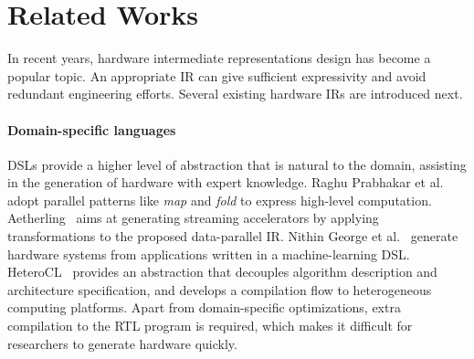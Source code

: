 \section{Related Works}

In recent years, hardware intermediate representations design has become a popular topic. An appropriate IR can give sufficient expressivity and avoid redundant engineering efforts. Several existing hardware IRs are introduced next.

\paragraph{Domain-specific languages} DSLs provide a higher level of abstraction that is natural to the domain, assisting in the generation of hardware with expert knowledge. Raghu Prabhakar et al.~\cite{parallel_pattern} adopt parallel patterns like \emph{map} and \emph{fold} to express high-level computation. Aetherling~\cite{aetherling} aims at generating streaming accelerators by applying transformations to the proposed data-parallel IR. Nithin George et al.~\cite{system_dsl} generate hardware systems from applications written in a machine-learning DSL. HeteroCL~\cite{heterocl} provides an abstraction that decouples algorithm description and architecture specification, and develops a compilation flow to heterogeneous computing platforms. Apart from domain-specific optimizations, extra compilation to the RTL program is required, which makes it difficult for researchers to generate hardware quickly.



